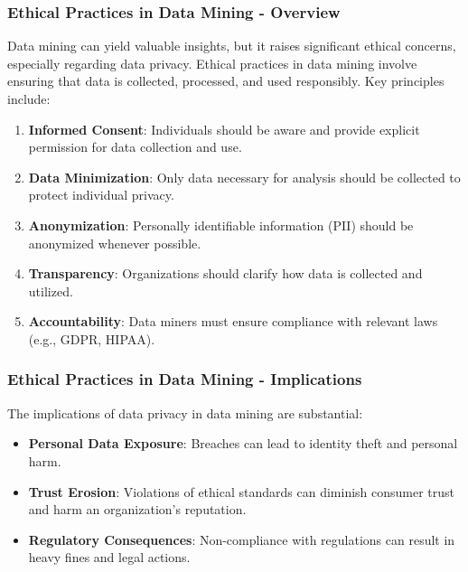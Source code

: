 \documentclass[aspectratio=169]{beamer}
\begin{document}
\begin{frame}[fragile]
    \frametitle{Ethical Practices in Data Mining - Overview}
    Data mining can yield valuable insights, but it raises significant ethical concerns, especially regarding data privacy. Ethical practices in data mining involve ensuring that data is collected, processed, and used responsibly. Key principles include:
    \begin{enumerate}
        \item \textbf{Informed Consent}: Individuals should be aware and provide explicit permission for data collection and use.
        \item \textbf{Data Minimization}: Only data necessary for analysis should be collected to protect individual privacy.
        \item \textbf{Anonymization}: Personally identifiable information (PII) should be anonymized whenever possible.
        \item \textbf{Transparency}: Organizations should clarify how data is collected and utilized.
        \item \textbf{Accountability}: Data miners must ensure compliance with relevant laws (e.g., GDPR, HIPAA).
    \end{enumerate}
\end{frame}

\begin{frame}[fragile]
    \frametitle{Ethical Practices in Data Mining - Implications}
    The implications of data privacy in data mining are substantial:
    \begin{itemize}
        \item \textbf{Personal Data Exposure}: Breaches can lead to identity theft and personal harm.
        \item \textbf{Trust Erosion}: Violations of ethical standards can diminish consumer trust and harm an organization's reputation.
        \item \textbf{Regulatory Consequences}: Non-compliance with regulations can result in heavy fines and legal actions.
    \end{itemize}
\end{frame}
\end{document}
